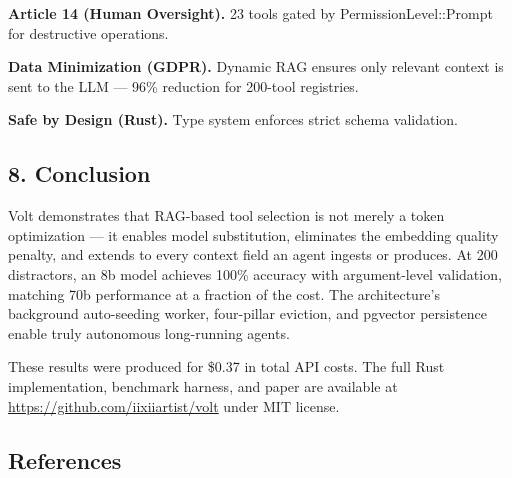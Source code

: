 \documentclass[
  10pt,
]{article}
\begin{document}
\textbf{Article 14 (Human Oversight).} 23 tools gated by
PermissionLevel::Prompt for destructive operations.

\textbf{Data Minimization (GDPR).} Dynamic RAG ensures only relevant
context is sent to the LLM --- 96\% reduction for 200-tool registries.

\textbf{Safe by Design (Rust).} Type system enforces strict schema
validation.

\subsection{8. Conclusion}\label{conclusion}

Volt demonstrates that RAG-based tool selection is not merely a token
optimization --- it enables model substitution, eliminates the embedding
quality penalty, and extends to every context field an agent ingests or
produces. At 200 distractors, an 8b model achieves 100\% accuracy with
argument-level validation, matching 70b performance at a fraction of the
cost. The architecture's background auto-seeding worker, four-pillar
eviction, and pgvector persistence enable truly autonomous long-running
agents.

These results were produced for \$0.37 in total API costs. The full Rust
implementation, benchmark harness, and paper are available at
\url{https://github.com/iixiiartist/volt} under MIT license.

\subsection*{References}\label{references}
\end{document}
